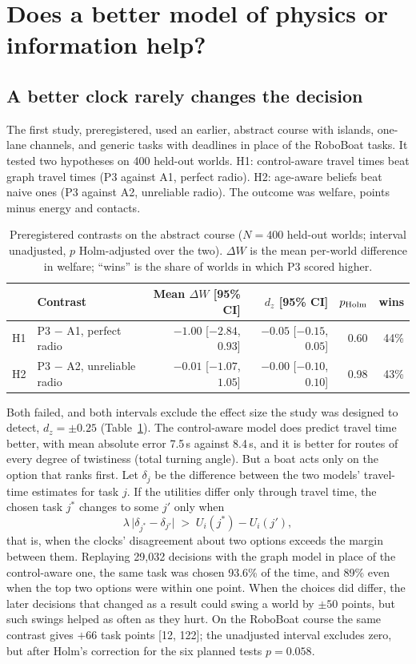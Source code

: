 \documentclass[11pt]{article}
\theoremstyle{definition}
\begin{document}
\section{Does a better model of physics or information help?}
\label{sec:q2}
\subsection{A better clock rarely changes the decision}
The first study, preregistered, used an earlier, abstract course with islands, one-lane channels, and generic tasks with deadlines in place of the RoboBoat tasks. It tested two hypotheses on 400 held-out worlds. H1: control-aware travel times beat graph travel times (P3 against A1, perfect radio). H2: age-aware beliefs beat naive ones (P3 against A2, unreliable radio). The outcome was welfare, points minus energy and contacts.

\begin{table}[h]
\centering\small
\caption{Preregistered contrasts on the abstract course ($N=400$ held-out worlds; interval unadjusted, $p$ Holm-adjusted over the two). $\Delta W$ is the mean per-world difference in welfare; ``wins'' is the share of worlds in which P3 scored higher.}
\label{tab:primary}
\begin{tabular}{llrrrr}
\toprule
 & Contrast & Mean $\Delta W$ [95\% CI] & $d_z$ [95\% CI] & $p_{\rm Holm}$ & wins\\\midrule
H1 & P3 $-$ A1, perfect radio & $-1.00$ [$-2.84$, $0.93$] & $-0.05$ [$-0.15$, $0.05$] & 0.60 & 44\%\\
H2 & P3 $-$ A2, unreliable radio & $-0.01$ [$-1.07$, $1.05$] & $-0.00$ [$-0.10$, $0.10$] & 0.98 & 43\%\\\bottomrule
\end{tabular}
\end{table}

Both failed, and both intervals exclude the effect size the study was designed to detect, $d_z=\pm0.25$ (Table~\ref{tab:primary}). The control-aware model does predict travel time better, with mean absolute error 7.5\,s against 8.4\,s, and it is better for routes of every degree of twistiness (total turning angle). But a boat acts only on the option that ranks first. Let $\delta_j$ be the difference between the two models' travel-time estimates for task $j$. If the utilities differ only through travel time, the chosen task $j^*$ changes to some $j'$ only when
\[
\lambda\,\big|\delta_{j^*}-\delta_{j'}\big| \;>\; U_i(j^*)-U_i(j'),
\]
that is, when the clocks' disagreement about two options exceeds the margin between them. Replaying 29{,}032 decisions with the graph model in place of the control-aware one, the same task was chosen 93.6\% of the time, and 89\% even when the top two options were within one point. When the choices did differ, the later decisions that changed as a result could swing a world by $\pm50$ points, but such swings helped as often as they hurt. On the RoboBoat course the same contrast gives $+66$ task points [12, 122]; the unadjusted interval excludes zero, but after Holm's correction for the six planned tests $p=0.058$.
\end{document}
